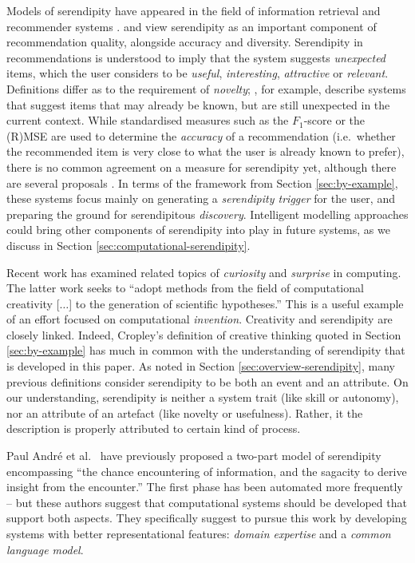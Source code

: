 Models of serendipity have appeared in the field of information retrieval \cite{foster2003serendipity} and recommender systems \cite{Toms2000}.   and  view serendipity as an important component of recommendation quality, alongside accuracy and diversity.  Serendipity in recommendations is
understood to imply that the system suggests \emph{unexpected} items, which the user considers to be \emph{useful}, \emph{interesting}, \emph{attractive} or \emph{relevant}. 
Definitions differ as to the requirement of \emph{novelty}; , for example, describe systems that suggest items that may already be known, but are still unexpected in the current context.  While standardised measures such as the $F_1$-score or the (R)MSE are used to determine the \emph{accuracy} of a recommendation (i.e.~whether the recommended item is very close to what the user is already known to prefer), there is no common agreement on a measure for serendipity yet, although there are several proposals \cite{Murakami2008, Adamopoulos2011, McCay-Peet2011,iaquinta2010can}.
In terms of the framework from Section \ref{sec:by-example}, these systems focus mainly on generating a \emph{serendipity trigger} for the user, and preparing the ground for serendipitous \emph{discovery}.  Intelligent modelling approaches could bring other components of serendipity into play in future systems, as we discuss in Section \ref{sec:computational-serendipity}.

Recent work has examined related topics of \emph{curiosity}
\cite{wu2013curiosity} and \emph{surprise} \cite{grace2014using} in
computing.  The latter work seeks to ``adopt methods from the field
of computational creativity [$\ldots$] to the generation of scientific hypotheses.''  This is a useful example of an effort focused on computational \emph{invention}.  
%
Creativity and serendipity are closely linked.  Indeed, Cropley's
definition of creative thinking quoted in Section
\ref{sec:by-example} has much in common with the understanding of
serendipity that is developed in this paper.  
As noted in Section \ref{sec:overview-serendipity},
many previous definitions consider serendipity to be both an event and an attribute.
%
On our understanding, serendipity is neither a system trait (like
skill or autonomy), nor an attribute of an artefact (like novelty or
usefulness).  Rather, it the description is properly attributed to
certain kind of process.

Paul Andr{\'e} et al.~\citeyear{andre2009discovery} have previously proposed a
two-part model of serendipity encompassing ``the chance encountering
of information, and the sagacity to derive insight from the
encounter.''  The first phase has been automated more frequently --
but these authors suggest that computational systems should be
developed that support both aspects.  They specifically suggest to
pursue this work by developing systems with better representational
features: \emph{domain expertise} and a \emph{common language model}.

